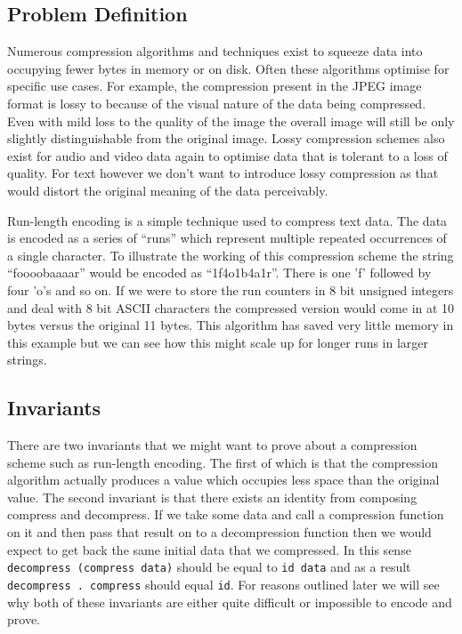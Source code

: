 \documentclass[a4paper, notitlepage]{report}
\begin{document}
\subsection{Problem Definition}
\label{sec:org0523564}
Numerous compression algorithms and techniques exist to squeeze data into
occupying fewer bytes in memory or on disk. Often these algorithms optimise for
specific use cases. For example, the compression present in the JPEG image
format is lossy to because of the visual nature of the data being compressed.
Even with mild loss to the quality of the image the overall image will still be
only slightly distinguishable from the original image. Lossy compression schemes
also exist for audio and video data again to optimise data that is tolerant to a
loss of quality. For text however we don't want to introduce lossy compression
as that would distort the original meaning of the data perceivably.

Run-length encoding is a simple technique used to compress text data. The data
is encoded as a series of ``runs'' which represent multiple repeated occurrences
of a single character. To illustrate the working of this compression scheme the
string ``foooobaaaar'' would be encoded as ``1f4o1b4a1r''. There is one 'f'
followed by four 'o's and so on. If we were to store the run counters in 8 bit
unsigned integers and deal with 8 bit ASCII characters the compressed version
would come in at 10 bytes versus the original 11 bytes. This algorithm has saved
very little memory in this example but we can see how this might scale up for
longer runs in larger strings.

\subsection{Invariants}
\label{sec:orgdc7d0a6}
There are two invariants that we might want to prove about a compression scheme
such as run-length encoding. The first of which is that the compression
algorithm actually produces a value which occupies less space than the original
value. The second invariant is that there exists an identity from composing
compress and decompress. If we take some data and call a compression function on
it and then pass that result on to a decompression function then we would expect
to get back the same initial data that we compressed. In this sense \texttt{decompress
(compress data)} should be equal to \texttt{id data} and as a result \texttt{decompress . compress}
should equal \texttt{id}. For reasons outlined later we will see why both of these
invariants are either quite difficult or impossible to encode and prove.
\end{document}
